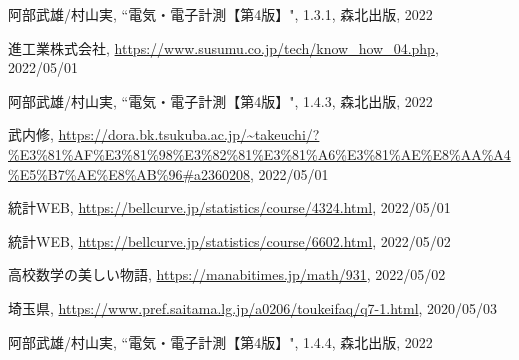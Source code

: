 \documentclass[fleqn,dvipdfmx]{jarticle}
\begin{document}
\begin{thebibliography}{9}
\item 阿部武雄/村山実, ``電気・電子計測【第4版】", 1.3.1, 森北出版, 2022
\item 進工業株式会社, \url{https://www.susumu.co.jp/tech/know_how_04.php}, 2022/05/01
\item 阿部武雄/村山実, ``電気・電子計測【第4版】", 1.4.3, 森北出版, 2022
\item 武内修, \url{https://dora.bk.tsukuba.ac.jp/~takeuchi/?%E3%81%AF%E3%81%98%E3%82%81%E3%81%A6%E3%81%AE%E8%AA%A4%E5%B7%AE%E8%AB%96#a2360208}, 2022/05/01
\item 統計WEB, \url{https://bellcurve.jp/statistics/course/4324.html}, 2022/05/01
\item 統計WEB, \url{https://bellcurve.jp/statistics/course/6602.html}, 2022/05/02
\item 高校数学の美しい物語, \url{https://manabitimes.jp/math/931}, 2022/05/02
\item 埼玉県, \url{https://www.pref.saitama.lg.jp/a0206/toukeifaq/q7-1.html}, 2020/05/03
\item 阿部武雄/村山実, ``電気・電子計測【第4版】", 1.4.4, 森北出版, 2022
\end{thebibliography}
\end{document}
